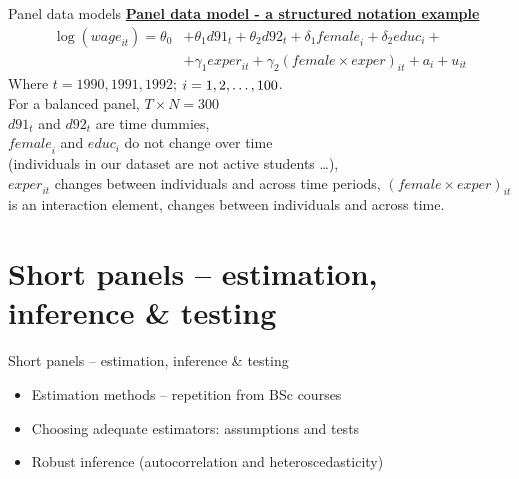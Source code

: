 \documentclass[usenames,dvipsnames]{beamer}
\newcommand{\mytikzmark}[2]{%
  \tikz[remember picture,inner sep=0pt,outer sep=0pt,baseline,anchor=base] 
    \node (#1) {\ensuremath{#2}};}
\begin{document}
\begin{frame}{Panel data models}
\textbf{\underline{Panel data model - a structured notation example}} \\
\begin{align*}
\log(\textit{wage}_{it}) = \theta_0 & + \theta_1 d91_t + \theta_2 d92_t + \delta_1 \textit{female}_i + \delta_2 \textit{educ}_i +\\
& + \gamma_1 \textit{exper}_{it} + \gamma_2 (\textit{female} \times \textit{exper})_{it} + a_i + u_{it}
\end{align*}
Where $t = 1990, 1991, 1992$; \quad $i = 1, 2, \dots , \mytikzmark{100}{100}$. \\
For a balanced panel, $T \times N = 300$ \\
\vspace{0.2cm}
$d91_t$ and $d92_t$ are time dummies, \\
$\textit{female}_i$ and $\textit{educ}_i$ do not change over time \\(individuals in our dataset are not active students \dots ), \\
$\textit{exper}_{it}$ changes between individuals and across time periods,
$(\textit{female} \times \textit{exper})_{it}$ is an interaction element, changes between individuals and across time.
\end{frame}
\section{Short panels -- estimation, inference \& testing}
\begin{frame}{Short panels -- estimation, inference \& testing}
    \begin{itemize}
        \item Estimation methods -- repetition from BSc courses
        \bigskip
        \item Choosing adequate estimators: assumptions and tests
        \bigskip
        \item Robust inference (autocorrelation and heteroscedasticity)
    \end{itemize}
\end{frame}
\end{document}
